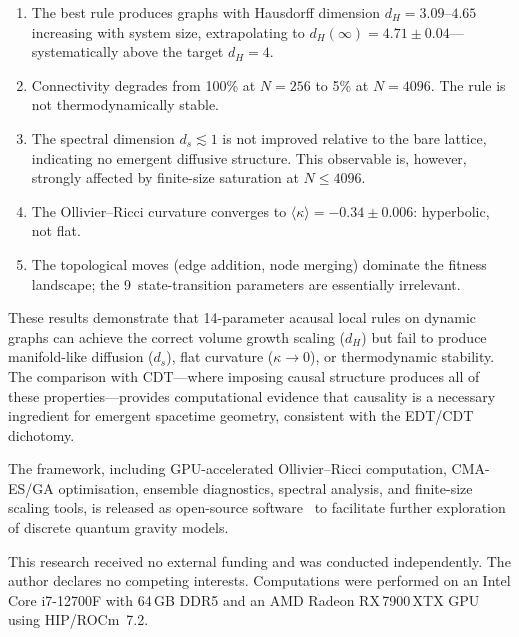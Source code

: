 \documentclass[aps,prd,twocolumn,superscriptaddress,floatfix]{revtex4-2}
\begin{document}
\begin{enumerate}
\item The best rule produces graphs with Hausdorff dimension
  $d_H = 3.09$--$4.65$ increasing with system size, extrapolating
  to $d_H(\infty) = 4.71 \pm 0.04$---systematically above the
  target $d_H = 4$.

\item Connectivity degrades from 100\% at $N = 256$ to 5\% at
  $N = 4096$.  The rule is not thermodynamically stable.

\item The spectral dimension $d_s \lesssim 1$ is not improved
  relative to the bare lattice, indicating no emergent diffusive
  structure.  This observable is, however, strongly affected by
  finite-size saturation at $N \le 4096$.

\item The Ollivier--Ricci curvature converges to
  $\langle\kappa\rangle = -0.34 \pm 0.006$: hyperbolic, not flat.

\item The topological moves (edge addition, node merging)
  dominate the fitness landscape; the 9~state-transition
  parameters are essentially irrelevant.
\end{enumerate}

These results demonstrate that 14-parameter acausal local rules
on dynamic graphs can achieve the correct volume growth scaling
($d_H$) but fail to produce manifold-like diffusion ($d_s$),
flat curvature ($\kappa \to 0$), or thermodynamic stability.
The comparison with CDT---where imposing causal structure
produces all of these properties---provides computational
evidence that causality is a necessary ingredient for emergent
spacetime geometry, consistent with the EDT/CDT dichotomy.

The framework, including GPU-accelerated Ollivier--Ricci
computation, CMA-ES/GA optimisation, ensemble diagnostics,
spectral analysis, and finite-size scaling tools, is released
as open-source software~\cite{discretum_code} to facilitate
further exploration of discrete quantum gravity models.

\begin{acknowledgments}
This research received no external funding and was conducted
independently.  The author declares no competing interests.
Computations were performed on an Intel Core i7-12700F with
64\,GB DDR5 and an AMD Radeon RX\,7900\,XTX GPU using
HIP/ROCm~7.2.
\end{acknowledgments}
\end{document}
